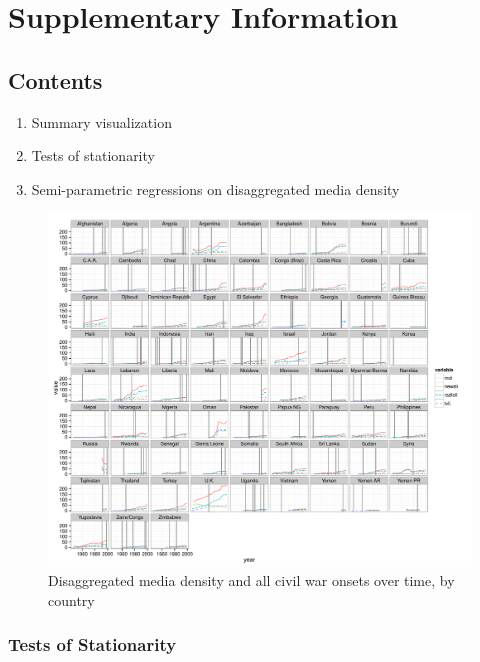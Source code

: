 \documentclass[11pt,article,oneside]{memoir}
\makeatletter
\def\maxwidth{\ifdim\Gin@nat@width>\linewidth\linewidth
\else\Gin@nat@width\fi}
\let\Oldincludegraphics\includegraphics
\renewcommand{\includegraphics}[1]{\Oldincludegraphics[width=\maxwidth]{#1}}
\makeatother
\begin{document}
\clearpage

\section{Supplementary Information}\label{supplementary-information}

\subsection{Contents}\label{contents}

\begin{enumerate}
\def\labelenumi{\arabic{enumi}.}
\itemsep1pt\parskip0pt
\item
  Summary visualization
\item
  Tests of stationarity
\item
  Semi-parametric regressions on disaggregated media density
\end{enumerate}

\begin{figure}[htbp]
\centering
\includegraphics{media_civil_war_files/figure-markdown/full_panel_plot.pdf}
\caption{Disaggregated media density and all civil war onsets over time,
by country}
\end{figure}

\subsubsection{Tests of Stationarity}\label{tests-of-stationarity}
\end{document}
